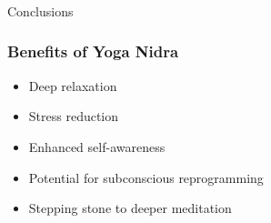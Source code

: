 \begin{frame}[fragile]\frametitle{}
\begin{center}
{\Large Conclusions}
\end{center}
\end{frame}

\begin{frame}[fragile]\frametitle{Benefits of Yoga Nidra}
    \begin{itemize}
        \item Deep relaxation
        \item Stress reduction
        \item Enhanced self-awareness
        \item Potential for subconscious reprogramming
        \item Stepping stone to deeper meditation
    \end{itemize}
\end{frame}

